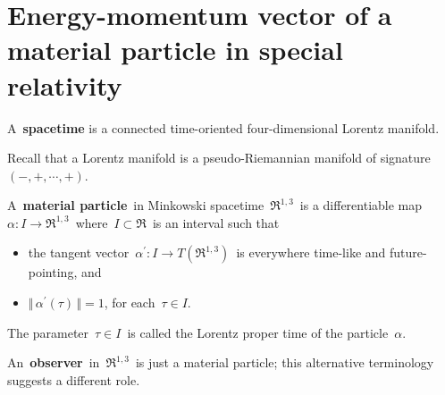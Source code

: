 

\section{Energy-momentum vector of a material particle in special relativity}
\setcounter{theorem}{0}
\setcounter{equation}{0}


\renewcommand{\theenumi}{\roman{enumi}}
\renewcommand{\labelenumi}{\textnormal{(\theenumi)}$\;\;$}


\begin{definition}
\mbox{}
\vskip -0.01cm
\noindent
A \,\textbf{spacetime} is a
connected time-oriented four-dimensional
Lorentz manifold.
\end{definition}

\begin{remark}
\mbox{}
\vskip -0.01cm
\noindent
Recall that a Lorentz manifold is a pseudo-Riemannian manifold of signature $(-,+,\cdots,+)$.
\end{remark}


\vskip 0.4cm
\begin{definition}
\mbox{}
\vskip -0.01cm
\noindent
A \,\textbf{material particle}\, in Minkowski spacetime \,$\Re^{1,3}$\, is a differentiable map
\,$\alpha : I \longrightarrow \Re^{1,3}$\,
where \,$I \subset \Re$\, is an interval such that
\begin{itemize}
\item
	the tangent vector \,$\alpha^{\prime} : I \longrightarrow T(\Re^{1,3})$\,
	is everywhere time-like and future-pointing, and
\item
	$\Vert\,\alpha^{\prime}(\tau)\,\Vert = 1$, for each \,$\tau \in I$. 
\end{itemize}
The parameter \,$\tau \in I$\, is called the Lorentz proper time of the particle \,$\alpha$.
\end{definition}

\begin{remark}
\mbox{}
\vskip -0.01cm
\noindent
An \,\textbf{observer}\, in \,$\Re^{1,3}$\, is just a material particle;
this alternative terminology suggests a different role.
\end{remark}


